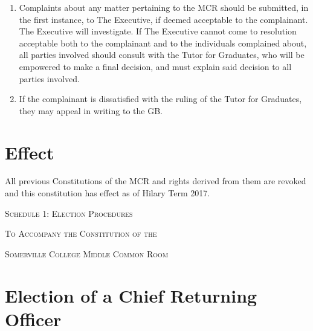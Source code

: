 \documentclass[11pt, a4paper]{article}
\begin{document}
\begin{enumerate}
	\item Complaints about any matter pertaining to the MCR should be submitted, in the first instance, to The Executive, if deemed acceptable to the complainant. The Executive will investigate. If The Executive cannot come to resolution acceptable both to the complainant and to the individuals complained about, all parties involved should consult with the Tutor for Graduates, who will be empowered to make a final decision, and must explain said decision to all parties involved.
    \item If the complainant is dissatisfied with the ruling of the Tutor for Graduates, they may appeal in writing to the GB.
\end{enumerate}





\section{Effect}
\label{sec:effect}

All previous Constitutions of the MCR and rights derived from them are revoked and this constitution has effect as of Hilary Term 2017.





\clearpage
\setcounter{section}{0}





\centerline{{\Huge \textsc{Schedule 1: Election Procedures}}}
\vspace{2mm}
\centerline{{\Large \textsc{To Accompany the Constitution of the}}}
\vspace{2mm}
\centerline{{\Large \textsc{Somerville College Middle Common Room}}}





\section{Election of a Chief Returning Officer}
\label{sec:cro}
\end{document}
